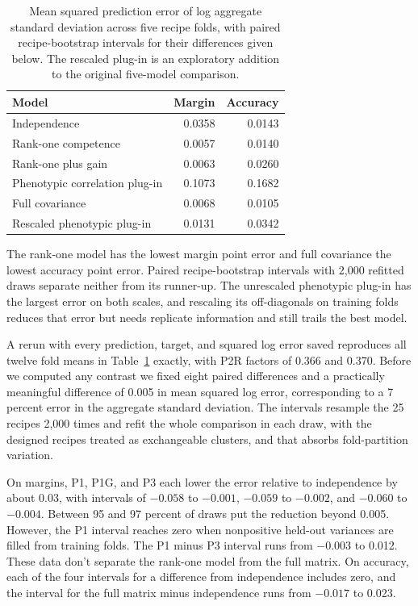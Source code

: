 \begin{table}[!htb]
\centering
\caption{Mean squared prediction error of log aggregate standard deviation across five recipe folds, with paired recipe-bootstrap intervals for their differences given below. The rescaled plug-in is an exploratory addition to the original five-model comparison.}
\label{tab:prediction}
\small\setlength{\tabcolsep}{4pt}\renewcommand{\arraystretch}{1.12}
\begin{tabular}{lrr}
\toprule
Model & Margin & Accuracy\\
\midrule
Independence & 0.0358 & 0.0143\\
Rank-one competence & 0.0057 & 0.0140\\
Rank-one plus gain & 0.0063 & 0.0260\\
Phenotypic correlation plug-in & 0.1073 & 0.1682\\
Full covariance & 0.0068 & 0.0105\\
Rescaled phenotypic plug-in & 0.0131 & 0.0342\\
\bottomrule
\end{tabular}
\end{table}

The rank-one model has the lowest margin point error and full covariance the lowest accuracy point error. Paired recipe-bootstrap intervals with 2,000 refitted draws separate neither from its runner-up. The unrescaled phenotypic plug-in has the largest error on both scales, and rescaling its off-diagonals on training folds reduces that error but needs replicate information and still trails the best model.

A rerun with every prediction, target, and squared log error saved reproduces all twelve fold means in Table~\ref{tab:prediction} exactly, with P2R factors of 0.366 and 0.370. Before we computed any contrast we fixed eight paired differences and a practically meaningful difference of 0.005 in mean squared log error, corresponding to a 7 percent error in the aggregate standard deviation. The intervals resample the 25 recipes 2,000 times and refit the whole comparison in each draw, with the designed recipes treated as exchangeable clusters, and that absorbs fold-partition variation.

On margins, P1, P1G, and P3 each lower the error relative to independence by about 0.03, with intervals of $-0.058$ to $-0.001$, $-0.059$ to $-0.002$, and $-0.060$ to $-0.004$. Between 95 and 97 percent of draws put the reduction beyond 0.005. However, the P1 interval reaches zero when nonpositive held-out variances are filled from training folds. The P1 minus P3 interval runs from $-0.003$ to 0.012. These data don't separate the rank-one model from the full matrix. On accuracy, each of the four intervals for a difference from independence includes zero, and the interval for the full matrix minus independence runs from $-0.017$ to 0.023.

